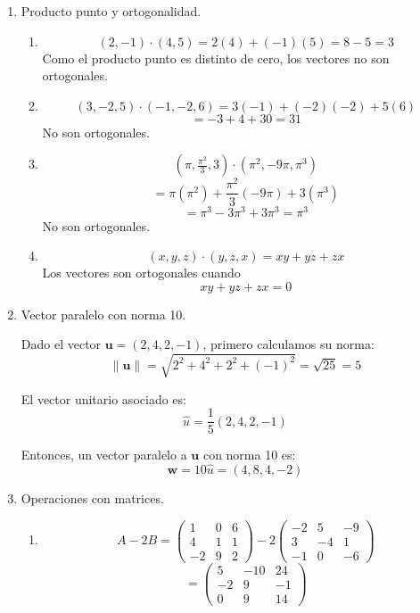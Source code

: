 \documentclass[12pt,letterpaper]{article}
\begin{document}
\begin{enumerate}


\item Producto punto y ortogonalidad.

\begin{enumerate}
    \item 
    \[
    (2,-1)\cdot(4,5)=2(4)+(-1)(5)=8-5=3
    \]
    Como el producto punto es distinto de cero, los vectores no son ortogonales.

    \item 
    \[
    (3,-2,5)\cdot(-1,-2,6)=3(-1)+(-2)(-2)+5(6)
    \]
    \[
    =-3+4+30=31
    \]
    No son ortogonales.

    \item 
    \[
    (\pi,\tfrac{\pi^2}{3},3)\cdot(\pi^2,-9\pi,\pi^3)
    \]
    \[
    =\pi(\pi^2)+\frac{\pi^2}{3}(-9\pi)+3(\pi^3)
    \]
    \[
    =\pi^3-3\pi^3+3\pi^3=\pi^3
    \]
    No son ortogonales.

    \item 
    \[
    (x,y,z)\cdot(y,z,x)=xy+yz+zx
    \]
    Los vectores son ortogonales cuando
    \[
    xy+yz+zx=0
    \]
\end{enumerate}


\item Vector paralelo con norma 10.

Dado el vector $\mathbf{u}=(2,4,2,-1)$, primero calculamos su norma:
\[
\|\mathbf{u}\|=\sqrt{2^2+4^2+2^2+(-1)^2}=\sqrt{25}=5
\]

El vector unitario asociado es:
\[
\hat{u}=\frac{1}{5}(2,4,2,-1)
\]

Entonces, un vector paralelo a $\mathbf{u}$ con norma 10 es:
\[
\mathbf{w}=10\hat{u}=(4,8,4,-2)
\]

\newpage

\item Operaciones con matrices.

\begin{enumerate}
    \item 
    \[
    A-2B=
    \begin{pmatrix}
    1 & 0 & 6\\
    4 & 1 & 1\\
    -2 & 9 & 2
    \end{pmatrix}
    -
    2\begin{pmatrix}
    -2 & 5 & -9\\
    3 & -4 & 1\\
    -1 & 0 & -6
    \end{pmatrix}
    \]
    \[
    =
    \begin{pmatrix}
    5 & -10 & 24\\
    -2 & 9 & -1\\
    0 & 9 & 14
    \end{pmatrix}
    \]


\end{enumerate}
\end{enumerate}
\end{document}
